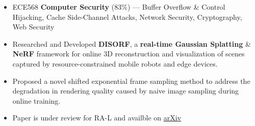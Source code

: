 \documentclass[10pt,a4paper,ragged2e,withhyper]{altacv}
\begin{document}
\begin{paracol}{2}
\begin{itemize}
        \item ECE568 \textbf{Computer Security} (83\%) --- Buffer Overflow \& Control Hijacking, Cache Side-Channel Attacks, Network Security, Cryptography, Web Security
    \end{itemize}

    \switchcolumn{}

    \begin{itemize}
        \item Researched and Developed \textbf{DISORF}, a \textbf{real-time Gaussian Splatting} \& \textbf{NeRF} framework for online 3D
              reconstruction and visualization of scenes captured by resource-constrained mobile robots and edge devices.
        \item Proposed a novel shifted exponential frame sampling method to address the degradation in rendering quality caused by naive image sampling during online training.
        \item Paper is under review for RA-L and availble on \href{https://arxiv.org/abs/2403.00228}{arXiv}
    \end{itemize}





\end{paracol}
\end{document}
